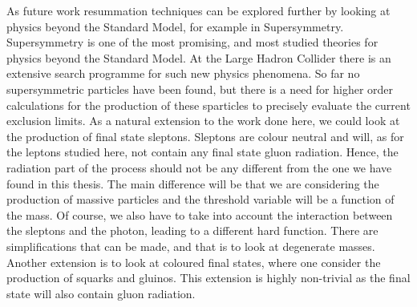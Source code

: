 \medskip
As future work resummation techniques can be explored further by looking at physics beyond the Standard Model, for example in Supersymmetry. Supersymmetry is one of the most promising, and most studied theories for physics beyond the Standard Model. At the Large Hadron Collider there is an extensive search programme for such new physics phenomena. So far no supersymmetric particles have been found, but there is a need for higher order calculations for the production of these sparticles to precisely evaluate the current exclusion limits. As a natural extension to the work done here, we could look at the production of final state sleptons. Sleptons are colour neutral and will, as for the leptons studied here, not contain any final state gluon radiation. Hence, the radiation part of the process should not be any different from the one we have found in this thesis. The main difference will be that we are considering the production of massive particles and the threshold variable will be a function of the mass. Of course, we also have to take into account the interaction between the sleptons and the photon, leading to a different hard function. There are simplifications that can be made, and that is to look at degenerate masses. Another extension is to look at coloured final states, where one consider the production of squarks and gluinos. This extension is highly non-trivial as the final state will also contain gluon radiation. 